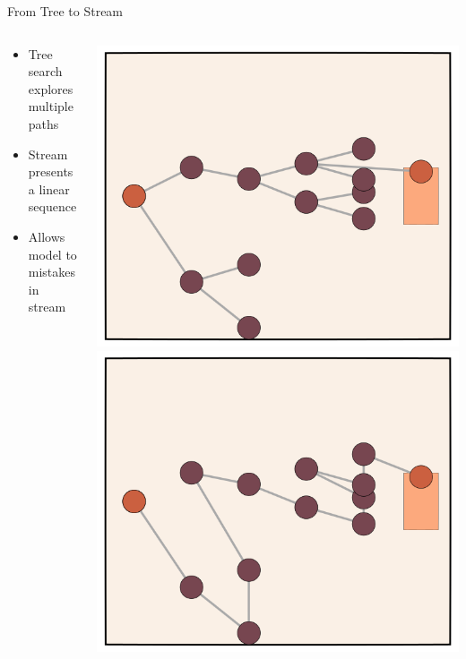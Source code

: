 \documentclass[14pt,aspectratio=169]{beamer}
\begin{document}
\begin{frame}{From Tree to Stream}
	\begin{columns}
		\begin{column}{0.5\linewidth}
			\begin{itemize}
				\item Tree search explores multiple paths
				\item Stream presents a linear sequence
				\item Allows model to mistakes in stream
			\end{itemize}
		\end{column}
		\begin{column}{0.5\linewidth}
			\includegraphics[height=0.4\textheight]{images/search}
			\includegraphics[height=0.4\textheight]{images/search2}
		\end{column}
	\end{columns}
\end{frame}
\end{document}
